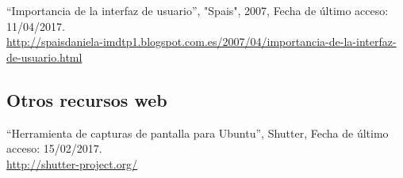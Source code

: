``Importancia de la interfaz de usuario'', "Spais", 2007, Fecha de último acceso: 11/04/2017.\\\href{http://spaisdaniela-imdtp1.blogspot.com.es/2007/04/importancia-de-la-interfaz-de-usuario.html}{http://spaisdaniela-imdtp1.blogspot.com.es/2007/04/importancia-de-la-interfaz-de-usuario.html}


\subsection{Otros recursos web}

``Herramienta de capturas de pantalla para Ubuntu'', Shutter, Fecha de último acceso: 15/02/2017.\\\href{http://shutter-project.org/}{http://shutter-project.org/}
